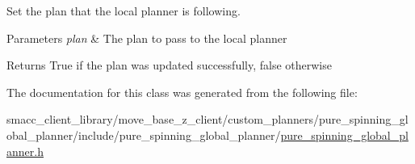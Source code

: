 Set the plan that the local planner is following. 


\begin{DoxyParams}{Parameters}
{\em plan} & The plan to pass to the local planner \\
\hline
\end{DoxyParams}
\begin{DoxyReturn}{Returns}
True if the plan was updated successfully, false otherwise 
\end{DoxyReturn}


The documentation for this class was generated from the following file\+:\begin{DoxyCompactItemize}
\item 
smacc\+\_\+client\+\_\+library/move\+\_\+base\+\_\+z\+\_\+client/custom\+\_\+planners/pure\+\_\+spinning\+\_\+global\+\_\+planner/include/pure\+\_\+spinning\+\_\+global\+\_\+planner/\hyperlink{pure__spinning__global__planner_8h}{pure\+\_\+spinning\+\_\+global\+\_\+planner.\+h}\end{DoxyCompactItemize}
